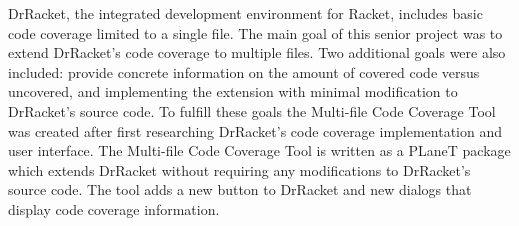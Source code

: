 DrRacket, the integrated development environment for Racket, includes basic code coverage limited to a single file. The main goal of this senior project was to extend DrRacket's code coverage to multiple files. Two additional goals were also included: provide concrete information on the amount of covered code versus uncovered, and implementing the extension with minimal modification to DrRacket's source code. To fulfill these goals the Multi-file Code Coverage Tool was created after first researching DrRacket's code coverage implementation and user interface. The Multi-file Code Coverage Tool is written as a PLaneT package which extends DrRacket without requiring any modifications to DrRacket's source code. The tool adds a new button to DrRacket and new dialogs that display code coverage information.
